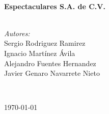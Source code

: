 \begin{center}
	\vspace*{1cm}
	\HRule \\[0.4cm]
	{ \huge \bfseries Espectaculares S.A. de C.V.}\\[0.4cm]
	\HRule \\[1.5cm]

	\begin{minipage}{0.46\textwidth}
		\begin{flushleft} \large
			\emph{Autores:}\\	
			Sergio Rodriguez Ramirez\\
			Ignacio Martínez Ávila\\
			Alejandro Fuentes Hernandez\\ 
			Javier Genaro Navarrete Nieto
		\end{flushleft}
	\end{minipage}		
    
	\vspace*{1cm}

	\\
	\vspace{2cm} 																				
	\begin{center}					
		{\large \today}
	\end{center}												  						
\end{center}